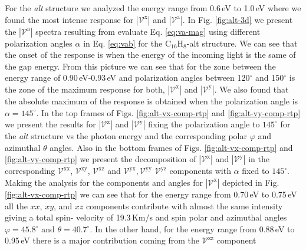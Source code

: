 \documentclass[prb,11pt,tightenlines,twocolumn,aps]{revtex4-1}
\begin{document}
For the \emph{alt} structure we analyzed the energy range from 0.6\,eV to
1.0\,eV where we found the most intense response for
$|\mathcal{V}^{\mathrm{x}}|$ and $|\mathcal{V}^{\mathrm{a}}|$. In Fig. 
\ref{fig:alt-3d} we present the $|\mathcal{V}^{\mathrm{a}}|$ spectra resulting 
from evaluate Eq. \eqref{eq:va-mag} using different polarization angles $\alpha$
in Eq. \eqref{eq:vab} for the C$_{16}$H$_{8}$-alt structure. We can see that the
onset of the response is when the energy of the incoming light is the same of
the gap energy.
%
From this picture we can see that for the zone between the energy range of
0.90\,eV-0.93\,eV and polarization angles between 120$^{\circ}$ and
150$^{\circ}$ is the zone of the maximum response for both,
$|\mathcal{V}^{\mathrm{x}}|$ and $|\mathcal{V}^{\mathrm{y}}|$. 
% 
We also found that the absolute maximum of the response is obtained when the
polarization angle is $\alpha = 145^{\circ}$. In the top frames of Figs.
\ref{fig:alt-vx-comp-rtp}  and \ref{fig:alt-vy-comp-rtp} we present the results
for $|\mathcal{V}^{\mathrm{x}}|$ and $|\mathcal{V}^{\mathrm{y}}|$ fixing the
polarization angle to $145^{\circ}$ for the \emph{alt} structure vs the photon
energy and the corresponding polar $\varphi$ and azimuthal $\theta$ angles.
Also in the bottom frames of Figs. \ref{fig:alt-vx-comp-rtp} and 
%
\ref{fig:alt-vy-comp-rtp} we present the decomposition of
$|\mathcal{V}^{\mathrm{x}}|$ and $|\mathcal{V}^{\mathrm{y}}|$ in the
corresponding $\mathcal{V}^{\mathrm{xx}}$, $\mathcal{V}^{\mathrm{xy}}$,
$\mathcal{V}^{\mathrm{xz}}$ and
$\mathcal{V}^{\mathrm{yx}},\mathcal{V}^{\mathrm{yy}}$
$\mathcal{V}^{\mathrm{yz}}$ components with $\alpha$ fixed to $145^{\circ}$.
Making the analysis for the components and angles for
$|\mathcal{V}^{\mathrm{x}}|$ depicted in Fig. \ref{fig:alt-vx-comp-rtp} we can
see that for the energy range from 0.70\,eV to 0.75\,eV all the $xx$, $xy$, and
$xz$ components contribute with almost the same intensity giving a total spin-
velocity of 19.3\,Km/s and spin polar and azimuthal angles $\varphi =
45.8^{\circ}$ and $\theta=40.7^{\circ}$.
%
In the other hand, for the energy range from 0.88\,eV to 0.95\,eV there is a
major contribution coming from the $\mathcal{V}^{\mathrm{xz}}$ component
\end{document}
